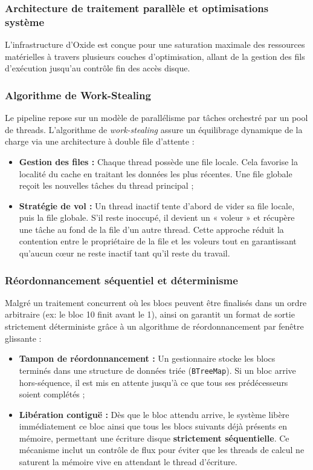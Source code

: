 \documentclass{article}
\begin{document}
\subsubsection{Architecture de traitement parallèle et optimisations système}

L'infrastructure d'Oxide est conçue pour une saturation maximale des ressources matérielles à travers plusieurs couches d'optimisation, allant de la gestion des fils d'exécution jusqu'au contrôle fin des accès disque.

\subsubsection*{Algorithme de Work-Stealing}

Le pipeline repose sur un modèle de parallélisme par tâches orchestré par un pool de threads. L'algorithme de \textit{work-stealing} assure un équilibrage dynamique de la charge via une architecture à double file d'attente :
\begin{itemize}
    \item \textbf{Gestion des files :} Chaque thread possède une file locale. Cela favorise la localité du cache en traitant les données les plus récentes. Une file globale reçoit les nouvelles tâches du thread principal ;
    \item \textbf{Stratégie de vol :} Un thread inactif tente d'abord de vider sa file locale, puis la file globale. S'il reste inoccupé, il devient un « voleur » et récupère une tâche au fond de la file d'un autre thread. Cette approche réduit la contention entre le propriétaire de la file et les voleurs tout en garantissant qu'aucun cœur ne reste inactif tant qu'il reste du travail.
\end{itemize}

\subsubsection*{Réordonnancement séquentiel et déterminisme}

Malgré un traitement concurrent où les blocs peuvent être finalisés dans un ordre arbitraire (ex: le bloc 10 finit avant le 1), ainsi on garantit un format de sortie strictement déterministe grâce à un algorithme de réordonnancement par fenêtre glissante :
\begin{itemize}
    \item \textbf{Tampon de réordonnancement :} Un gestionnaire stocke les blocs terminés dans une structure de données triée (\texttt{BTreeMap}). Si un bloc arrive hors-séquence, il est mis en attente jusqu'à ce que tous ses prédécesseurs soient complétés ;
    \item \textbf{Libération contiguë :} Dès que le bloc attendu arrive, le système libère immédiatement ce bloc ainsi que tous les blocs suivants déjà présents en mémoire, permettant une écriture disque \textbf{strictement séquentielle}. Ce mécanisme inclut un contrôle de flux pour éviter que les threads de calcul ne saturent la mémoire vive en attendant le thread d'écriture.
\end{itemize}
\end{document}

